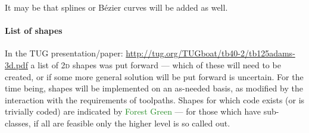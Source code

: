 \documentclass{ltxdoc}
\begin{document}
It may be that splines or Bézier curves will be added as well.

\paragraph{List of shapes}

In the TUG presentation/paper: \url{http://tug.org/TUGboat/tb40-2/tb125adams-3d.pdf} a list of \textsc{2d} shapes was put forward --- which of these will need to be created, or if some more general solution will be put forward is uncertain. For the time being, shapes will be implemented on an as-needed basis, as modified by the interaction with the requirements of toolpaths. Shapes for which code exists (or is trivially coded) are indicated by \textcolor{ForestGreen}{Forest Green} --- for those which have sub-classes, if all are feasible only the higher level is so called out.
\end{document}
